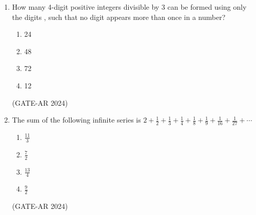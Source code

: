 \documentclass[a4paper,10pt]{article}
\begin{document}
\begin{enumerate}
    \item How many 4-digit positive integers divisible by 3 can be formed using only the digits , such that no digit appears more than once in a number?
    \begin{multicols}{4}
    \begin{enumerate}
        \item 24
        \item 48
        \item 72
        \item 12
    \end{enumerate}
    \end{multicols}
    \hfill (GATE-AR 2024)

    \item The sum of the following infinite series is
    $2 + \frac{1}{2} + \frac{1}{3} + \frac{1}{4} + \frac{1}{8} + \frac{1}{9} + \frac{1}{16} + \frac{1}{27} + \cdots$
    \begin{multicols}{4}
    \begin{enumerate}
        \item $\frac{11}{3}$
        \item $\frac{7}{2}$
        \item $\frac{13}{4}$
        \item $\frac{9}{2}$
    \end{enumerate}
    \end{multicols}
    \hfill (GATE-AR 2024)


\end{enumerate}
\end{document}
